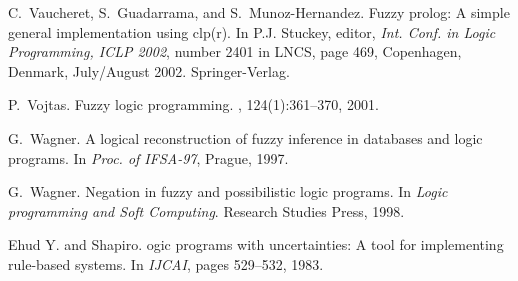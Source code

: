 \documentclass[runningheads,a4paper]{llncs}
\begin{document}
\begin{thebibliography}{10}
C.~Vaucheret, S.~Guadarrama, and S.~Munoz-Hernandez.
\newblock Fuzzy prolog: A simple general implementation using clp(r).
\newblock In P.J. Stuckey, editor, {\em Int. Conf. in {L}ogic {P}rogramming,
  ICLP 2002}, number 2401 in LNCS, page 469, Copenhagen, Denmark, July/August
  2002. Springer-Verlag.

P.~Vojtas.
\newblock Fuzzy logic programming.
, 124(1):361--370, 2001.

G.~Wagner.
\newblock A logical reconstruction of fuzzy inference in databases and logic
  programs.
\newblock In {\em Proc. of IFSA-97}, Prague, 1997.

G.~Wagner.
\newblock Negation in fuzzy and possibilistic logic programs.
\newblock In {\em {L}ogic programming and Soft Computing}. Research Studies
  Press, 1998.

Ehud Y. and Shapiro.
ogic programs with uncertainties: A tool for implementing
  rule-based systems.
\newblock In {\em IJCAI}, pages 529--532, 1983.

\end{thebibliography}
\end{document}

